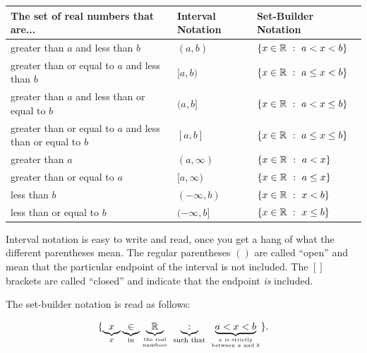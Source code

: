 \begin{center}
\renewcommand{\arraystretch}{1.1}
\begin{tabular}{p{3.5in} p{1.25in} p{1.3in}}
\toprule[0.4mm]
The set of real numbers that are... & \textbf{Interval Notation} & \textbf{Set-Builder Notation} \\ \midrule
greater than $a$ and less than $b$ & $(a,b)$ & $\{x\in\mathbb{R}\ :\ a < x < b\}$ \\
greater than or equal to $a$ and less than $b$ & $[a,b)$ & $\{x\in\mathbb{R}\ :\ a \leq x < b\}$ \\
greater than $a$ and less than or equal to $b$ & $(a,b]$ & $\{x\in\mathbb{R}\ :\ a < x \leq b\}$ \\
greater than or equal to $a$ and less than or equal to $b$ & $[a,b]$ & $\{x\in\mathbb{R}\ :\ a \leq x \leq b\}$ \\
greater than $a$ & $(a,\infty)$ & $\{x\in\mathbb{R}\ :\ a < x\}$ \\
greater than or equal to $a$ & $[a,\infty)$ & $\{x\in\mathbb{R}\ :\ a \leq x\}$ \\
less than $b$ & $(-\infty,b)$ & $\{x\in\mathbb{R}\ :\ x < b\}$ \\
less than or equal to $b$ & $(-\infty,b]$ & $\{x\in\mathbb{R}\ :\ x \leq b\}$ \\
\bottomrule
\end{tabular}
\end{center}


Interval notation is easy to write and read, once you get a hang of what the different parentheses mean. The regular parentheses $()$ are called ``open'' and mean that the particular endpoint of the interval is not included. The $[]$ brackets are called ``closed'' and indicate that the endpoint \textit{is} included. \mar{Why aren't $(a,\infty]$, $(a,\infty]$, $[-\infty,b)$, and $[-\infty,b]$ included in the table?}

The set-builder notation is read as follows:


\begin{Large}
$$
\{
\underbrace{x}_x
\underbrace{\in}_\text{in}
\underbrace{\R}_{\text{the real}\atop\text{numbers}}
\ \underbrace{:}_\text{such that}\ 
\underbrace{a < x < b}_{x\text{ is strictly}\atop\text{between }a\text{ and }b}
\}.
$$
\end{Large}



